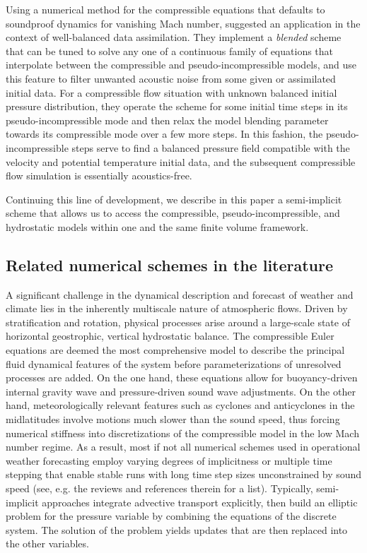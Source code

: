 \documentclass{ametsoc}
\theoremstyle{definition}
\begin{document}
Using a numerical method for the compressible equations that defaults to soundproof dynamics for vanishing Mach number, \citet{BenacchioEtAl2014} suggested an application in the context of well-balanced data assimilation. They implement a \textit{blended} scheme that can be tuned to solve any one of a continuous family of equations that interpolate between the compressible and pseudo-incompressible models, and use this feature to filter unwanted acoustic noise from some given or assimilated initial data. For a compressible flow situation with unknown balanced initial pressure distribution, they operate the scheme for some initial time steps in its pseudo-incompressible mode and then relax the model blending parameter towards its compressible mode over a few more steps. In this fashion, the pseudo-incompressible steps serve to find a balanced pressure field compatible with the velocity and potential temperature initial data, and the subsequent compressible flow simulation is essentially acoustics-free.

Continuing this line of development, we describe in this paper a semi-implicit scheme that allows us to access the compressible, pseudo-incompressible, and hydrostatic models within one and the same finite volume framework. 


\subsection{Related numerical schemes in the literature}

A significant challenge in the dynamical description and forecast of weather and climate lies in the inherently multiscale nature of atmospheric flows. Driven by stratification and rotation, physical processes arise around a large-scale state of horizontal geostrophic, vertical hydrostatic balance. The compressible Euler equations are deemed the most comprehensive model to describe the principal fluid dynamical features of the system before parameterizations of unresolved processes are added. On the one hand, these equations allow for buoyancy-driven internal gravity wave and pressure-driven sound wave adjustments.  On the other hand, meteorologically relevant features such as cyclones and anticyclones in the midlatitudes involve motions much slower than the sound speed, thus forcing numerical stiffness into discretizations of the compressible model in the low Mach number regime. As a result, most if not all numerical schemes used in operational weather forecasting employ varying degrees of implicitness or multiple time stepping that enable stable runs with long time step sizes unconstrained by sound speed (see, e.g. the reviews \cite{MarrasEtAl2016, MengaldoEtAl2018} and references therein for a list). Typically, semi-implicit approaches integrate advective transport explicitly, then build an elliptic problem for the pressure variable by combining the equations of the discrete system. The solution of the problem yields updates that are then replaced into the other variables. 
\end{document}
